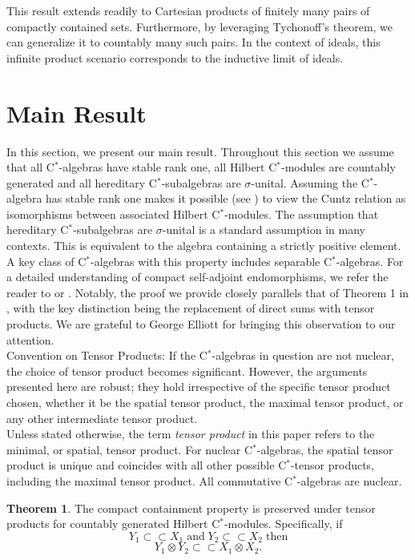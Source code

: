 \documentclass{iopconfser}
\theoremstyle{definition}
\newtheorem{theorem}{Theorem}[section]
\begin{document}
This result extends readily to Cartesian products of finitely many pairs of compactly contained sets. Furthermore, by leveraging Tychonoff's theorem, we can generalize it to countably many such pairs.  In the context of ideals, this infinite product scenario corresponds to the inductive limit of ideals.
 

 \section{Main Result}
In this section, we present our main result. Throughout this section we assume that all C$^*$-algebras have stable rank one, all Hilbert C$^*$-modules are countably generated and all hereditary C$^*$-subalgebras are $\sigma$-unital. Assuming the C$^*$-algebra has stable rank one makes it possible (see \cite{CEI}) to view the Cuntz relation as isomorphisms between associated Hilbert C$^*$-modules. The assumption that hereditary C$^*$-subalgebras are $\sigma$-unital is a standard assumption in many contexts. This is equivalent to the algebra containing a strictly positive element. A key class of C$^*$-algebras with this property includes separable C$^*$-algebras. For a detailed understanding of compact self-adjoint endomorphisms, we refer the reader to \cite{Man} or \cite{Lan}. Notably, the proof we provide closely parallels that of Theorem 1 in \cite{CEI}, with the key distinction being the replacement of direct sums with tensor products. We are grateful to George Elliott for bringing this observation to our attention.\\

Convention on Tensor Products: If the C$^*$-algebras in question are not nuclear, the choice of tensor product becomes significant. However, the arguments presented here are robust; they hold irrespective of the specific tensor product chosen, whether it be the spatial tensor product, the maximal tensor product, or any other intermediate tensor product.\\

Unless stated otherwise, the term \textit{tensor product} in this paper refers to the minimal, or spatial, tensor product. For nuclear C$^*$-algebras, the spatial tensor product is unique and coincides with all other possible C$^*$-tensor products, including the maximal tensor product. All commutative C$^*$-algebras are nuclear.

\begin{theorem} 
The compact containment property is preserved under tensor products for countably generated Hilbert C$^*$-modules. Specifically, if 
$$Y_1 \subset \subset X_1\;\mathrm{and}\; Y_2 \subset \subset X_2\;\mathrm{then} $$
    $$Y_1 \otimes Y_2 \subset \subset X_1 \otimes X_2.$$
\end{theorem}
\end{document}
